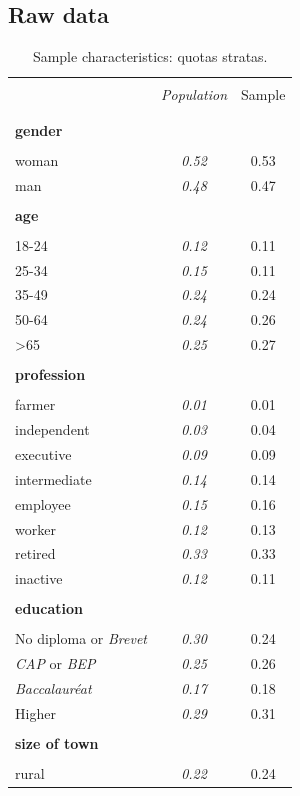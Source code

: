 \documentclass[english,5p,authoryear]{elsarticle}
\begin{document}

\begin{appendices}

\section{Raw data\label{app:Raw-Data}}

\begin{table}[!htbp]
\label{table:sample_characteristics}
\caption{\label{tab:Sample-Characteristics}Sample characteristics: quotas stratas.}
\centering
\begin{tabular}{lcc}
\hline \hline  \\[-1.8ex]
 & \emph{Population} & Sample  \tabularnewline \\[-1.8ex]
\hline  \\[-1.8ex]
\textbf{gender} & & \tabularnewline  \\[-1.8ex]
woman & \emph{0.52} & 0.53\tabularnewline
man & \emph{0.48} & 0.47\tabularnewline
\hline \\[-1.8ex]
\textbf{age} &  & \tabularnewline  \\[-1.8ex]
18-24 & \emph{0.12} & 0.11\tabularnewline
25-34 & \emph{0.15} & 0.11\tabularnewline
35-49 & \emph{0.24} & 0.24\tabularnewline
50-64 & \emph{0.24} & 0.26\tabularnewline
>65 & \emph{0.25} & 0.27\tabularnewline
\hline \\[-1.8ex]
\textbf{profession} &  & \tabularnewline  \\[-1.8ex]
farmer & \emph{0.01} & 0.01\tabularnewline
independent & \emph{0.03} & 0.04\tabularnewline
executive & \emph{0.09} & 0.09\tabularnewline
intermediate & \emph{0.14} & 0.14\tabularnewline
employee & \emph{0.15} & 0.16\tabularnewline
worker & \emph{0.12} & 0.13\tabularnewline
retired & \emph{0.33} & 0.33\tabularnewline
inactive & \emph{0.12} & 0.11\tabularnewline
\hline  \\[-1.8ex]
\textbf{education} &  & \tabularnewline  \\[-1.8ex]
No diploma or \emph{Brevet} & \emph{0.30} & 0.24\tabularnewline
\emph{CAP} or \emph{BEP} & \emph{0.25} & 0.26\tabularnewline
\emph{Baccalauréat} & \emph{0.17} & 0.18\tabularnewline
Higher & \emph{0.29} & 0.31\tabularnewline
\hline  \\[-1.8ex]
\textbf{size of town} &  & \tabularnewline  \\[-1.8ex]
rural & \emph{0.22} & 0.24\tabularnewline

\end{tabular}
\end{table}
\end{appendices}
\end{document}
